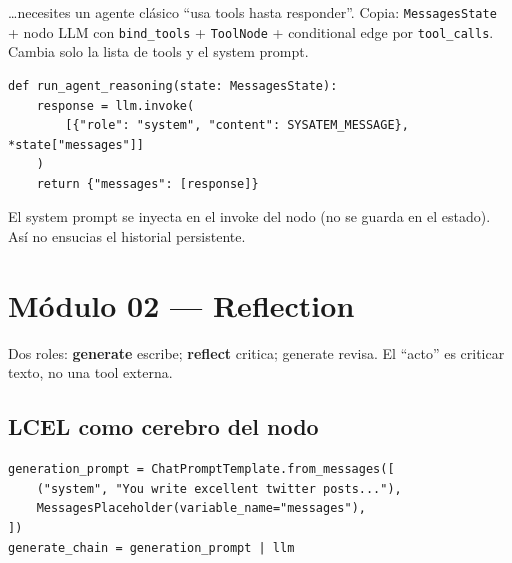\documentclass[11pt,a4paper]{article}
\begin{document}
\begin{howto}[title=Reutiliza este patrón cuando\ldots]
\ldots{}necesites un agente clásico ``usa tools hasta responder''.
Copia: \texttt{MessagesState} + nodo LLM con \texttt{bind\_tools} + \texttt{ToolNode} + conditional edge por \texttt{tool\_calls}.
Cambia solo la lista de tools y el system prompt.
\end{howto}

\begin{fromcode}[title=nodes.py --- reason añade un AIMessage]
\begin{lstlisting}
def run_agent_reasoning(state: MessagesState):
    response = llm.invoke(
        [{"role": "system", "content": SYSATEM_MESSAGE}, *state["messages"]]
    )
    return {"messages": [response]}
\end{lstlisting}
\end{fromcode}

\begin{tip}
El system prompt se inyecta en el invoke del nodo (no se guarda en el estado).
Así no ensucias el historial persistente.
\end{tip}

\section{Módulo 02 --- Reflection}
\label{sec:reflect}

\begin{concept}[title=Idea]
Dos roles: \textbf{generate} escribe; \textbf{reflect} critica; generate revisa.
El ``acto'' es criticar texto, no una tool externa.
\end{concept}

\begin{center}
\end{center}

\subsection{LCEL como cerebro del nodo}
\begin{lstlisting}
generation_prompt = ChatPromptTemplate.from_messages([
    ("system", "You write excellent twitter posts..."),
    MessagesPlaceholder(variable_name="messages"),
])
generate_chain = generation_prompt | llm
\end{lstlisting}
\end{document}
